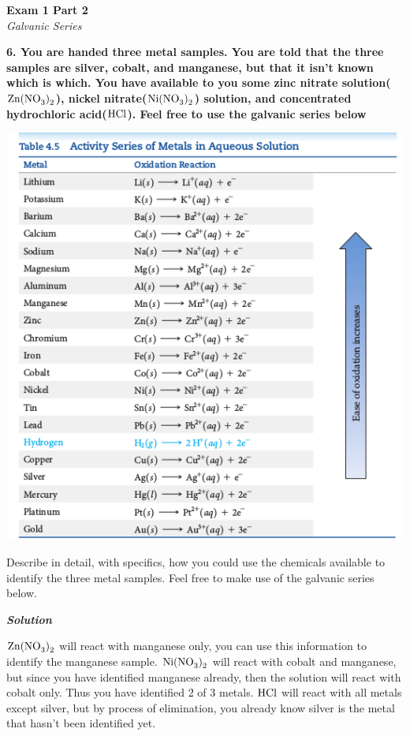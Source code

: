 \documentclass{article}
\begin{document}
    \begin{center}
        \textbf{Exam 1 Part 2}\\
        \textit{Galvanic Series}
    \end{center}
    \textbf{6. You are handed three metal samples. You are told that the three samples are silver, cobalt, and manganese, but that it isn't known which is which. You have available to you some zinc nitrate solution($\ce{Zn(NO3)2}$), nickel nitrate($\ce{Ni(NO3)2}$) solution, and concentrated hydrochloric acid($\ce{HCl}$). Feel free to use the galvanic series below}
    \begin{center}
        \includegraphics[scale=0.5]{table_4_5}\\[1cm]
    \end{center}
    Describe in detail, with specifics, how you could use the chemicals available to identify the three metal samples. Feel free to make use of the galvanic series below.

    \textbf{\textit{Solution}}

    $\ce{Zn(NO3)2}$ will react with manganese only, you can use this information to identify the manganese sample. $\ce{Ni(NO3)2}$ will react with cobalt and manganese, but since you have identified manganese already, then the solution will react with cobalt only. Thus you have identified 2 of 3 metals. $\ce{HCl}$ will react with all metals except silver, but by process of elimination, you already know silver is the metal that hasn't been identified yet.
\end{document}

